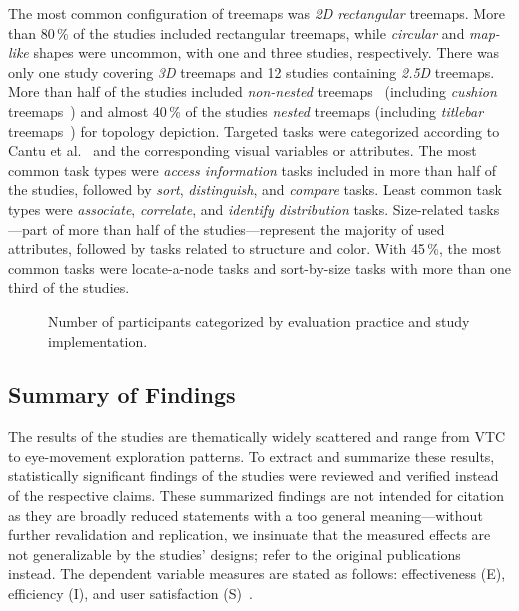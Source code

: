 \documentclass[sigconf,
natbib=true]{acmart}
\begin{document}
The most common configuration of treemaps was \emph{2D} \emph{rectangular} treemaps.
More than 80\,\% of the studies included rectangular treemaps, while \emph{circular} and \emph{map-like} shapes were uncommon, with one and three studies, respectively. 
There was only one study covering \emph{3D} treemaps and 12 studies containing \emph{2.5D} treemaps.
More than half of the studies included \emph{non-nested} treemaps~\cite{johnson1993-categorical} (including \emph{cushion} treemaps~\cite{vanwijk1999-cushion}) and almost 40\,\% of the studies \emph{nested} treemaps (including \emph{titlebar} treemaps~\cite{goldberg2005-monitoring}) for topology depiction.
Targeted tasks were categorized according to Cantu et al.~\cite{cantu2017-relations} and the corresponding visual variables or attributes.
The most common task types were \emph{access information} tasks included in more than half of the studies, followed by \emph{sort}, \emph{distinguish}, and \emph{compare} tasks.
Least common task types were \emph{associate}, \emph{correlate}, and \emph{identify distribution} tasks. 
Size-related tasks---part of more than half of the studies---represent the majority of used attributes, followed by tasks related to structure and color.
With 45\,\%, the most common tasks were locate-a-node tasks and sort-by-size tasks with more than one third of the studies.

\begin{figure}[t]%
	\centering%
	\vspace{-1.2em}
	\caption{Number of participants categorized by evaluation practice and study implementation.}%
	\label{fig:participants}%
\end{figure}%

\subsection{Summary of Findings}
\label{sec:summary:findings}
The results of the studies are thematically widely scattered and range from VTC to eye-movement exploration patterns.
To extract and summarize these results, statistically significant findings of the studies were reviewed and verified instead of the respective claims.
These summarized findings are not intended for citation as they are broadly reduced statements with a too general meaning---without further revalidation and replication, we insinuate that the measured effects are not generalizable by the studies' designs; refer to the original publications instead.
The dependent variable measures are stated as follows: effectiveness (E), efficiency (I), and user satisfaction (S)~\cite{leroy2011-designing}.
\end{document}
